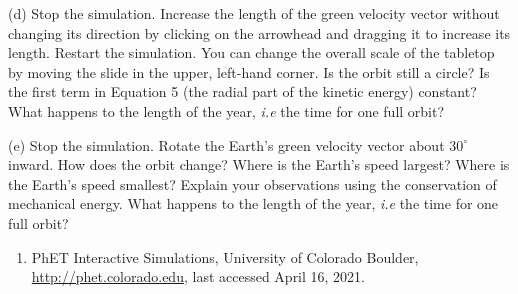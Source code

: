 \answerspace{2.0cm}

(d) Stop the simulation. Increase the length of the green velocity vector 
without changing its direction by clicking on the arrowhead 
and dragging it to increase its length.
Restart the simulation.
You can change the overall scale of the tabletop by moving the slide
in the upper, left-hand corner.
Is the orbit still a circle?
Is the first term in Equation 5 (the radial part of the kinetic energy) constant?
What happens to the length of the year, {\it i.e} the time for one full orbit?

\answerspace{2.5cm}

(e) Stop the simulation. Rotate the Earth's green velocity vector about $30^\circ $ inward.
How does the orbit change? 
Where is the Earth's speed largest?
Where is the Earth's speed smallest?
Explain your observations using the conservation of mechanical energy.
What happens to the length of the year, {\it i.e} the time for one full orbit?

\answerspace{2.5cm}
 

\begin{enumerate}

\item PhET Interactive Simulations, University of Colorado Boulder, \url{http://phet.colorado.edu},
last accessed April 16, 2021.

\end{enumerate}
